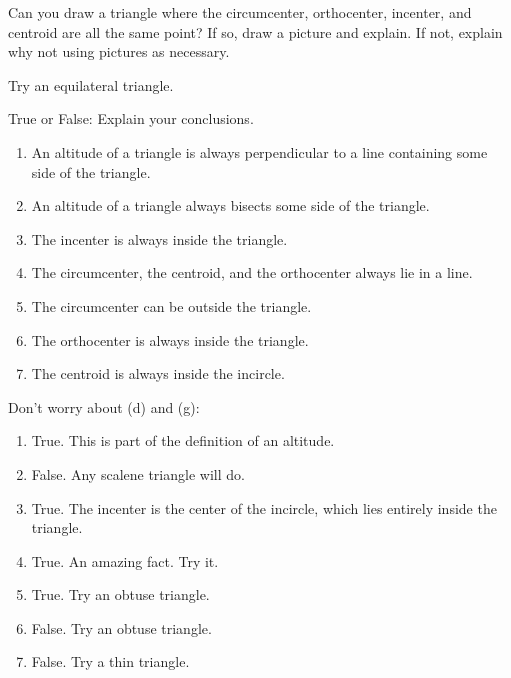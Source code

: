 \documentclass[nooutcomes]{ximera}
\begin{document}
\begin{problem}
Can you draw a triangle where the circumcenter, orthocenter,
  incenter, and centroid are all the same point?  If so, draw a
  picture and explain. If not, explain why not using pictures as
  necessary.
\begin{freeResponse}
\begin{hint}
Try an equilateral triangle.  
\end{hint}
\end{freeResponse}
\end{problem}

\begin{problem}
True or False: Explain your conclusions.
\begin{enumerate}
\item An altitude of a triangle is always perpendicular to a line
  containing some side of the triangle.
\item An altitude of a triangle always bisects some side of the
  triangle.
\item The incenter is always inside the triangle.
\item The circumcenter, the centroid, and the orthocenter always lie in a line.
\item The circumcenter can be outside the triangle.
\item The orthocenter is always inside the triangle.
\item The centroid is always inside the incircle.
\end{enumerate}
\begin{freeResponse}
\begin{hint}
Don't worry about (d) and (g):
\begin{enumerate}
\item True.  This is part of the definition of an altitude.  %
\item False.  Any scalene triangle will do.  %
\item True.  The incenter is the center of the incircle, which lies entirely inside the triangle.  %
\item True.  An amazing fact.  Try it.  %
\item True.  Try an obtuse triangle.  %
\item False.  Try an obtuse triangle.  %
\item False.  Try a thin triangle.  %
\end{enumerate}
\end{hint}
\end{freeResponse}
\end{problem}
\end{document}
